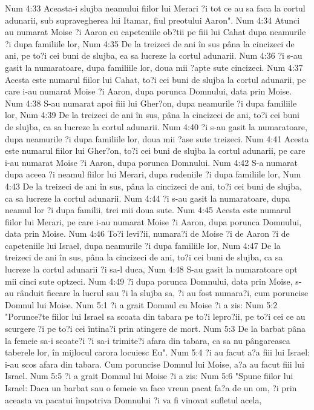 Num 4:33  Aceasta-i slujba neamului fiilor lui Merari ?i tot ce au sa faca la cortul adunarii, sub supravegherea lui Itamar, fiul preotului Aaron".
Num 4:34  Atunci au numarat Moise ?i Aaron cu capeteniile ob?tii pe fiii lui Cahat dupa neamurile ?i dupa familiile lor,
Num 4:35  De la treizeci de ani în sus pâna la cincizeci de ani, pe to?i cei buni de slujba, ea sa lucreze la cortul adunarii.
Num 4:36  ?i s-au gasit la numaratoare, dupa familiile lor, doua mii ?apte sute cincizeci.
Num 4:37  Acesta este numarul fiilor lui Cahat, to?i cei buni de slujba la cortul adunarii, pe care i-au numarat Moise ?i Aaron, dupa porunca Domnului, data prin Moise.
Num 4:38  S-au numarat apoi fiii lui Gher?on, dupa neamurile ?i dupa familiile lor,
Num 4:39  De la treizeci de ani în sus, pâna la cincizeci de ani, to?i cei buni de slujba, ca sa lucreze la cortul adunarii.
Num 4:40  ?i s-au gasit la numaratoare, dupa neamurile ?i dupa familiile lor, doua mii ?ase sute treizeci.
Num 4:41  Acesta este numarul fiilor lui Gher?on, to?i cei buni de slujba la cortul adunarii, pe care i-au numarat Moise ?i Aaron, dupa porunca Domnului.
Num 4:42  S-a numarat dupa aceea ?i neamul fiilor lui Merari, dupa rudeniile ?i dupa familiile lor,
Num 4:43  De la treizeci de ani în sus, pâna la cincizeci de ani, to?i cei buni de slujba, ca sa lucreze la cortul adunarii.
Num 4:44  ?i s-au gasit la numaratoare, dupa neamul lor ?i dupa familii, trei mii doua sute.
Num 4:45  Acesta este numarul fiilor lui Merari, pe care i-au numarat Moise ?i Aaron, dupa porunca Domnului, data prin Moise.
Num 4:46  To?i levi?ii, numara?i de Moise ?i de Aaron ?i de capeteniile lui Israel, dupa neamurile ?i dupa familiile lor,
Num 4:47  De la treizeci de ani în sus, pâna la cincizeci de ani, to?i cei buni de slujba, ca sa lucreze la cortul adunarii ?i sa-l duca,
Num 4:48  S-au gasit la numaratoare opt mii cinci sute optzeci.
Num 4:49  ?i dupa porunca Domnului, data prin Moise, s-au rânduit fiecare la lucrul sau ?i la slujba sa, ?i au fost numara?i, cum poruncise Domnul lui Moise.
Num 5:1  ?i a grait Domnul cu Moise ?i a zis:
Num 5:2  "Porunce?te fiilor lui Israel sa scoata din tabara pe to?i lepro?ii, pe to?i cei ce au scurgere ?i pe to?i cei întina?i prin atingere de mort.
Num 5:3  De la barbat pâna la femeie sa-i scoate?i ?i sa-i trimite?i afara din tabara, ca sa nu pângareasca taberele lor, în mijlocul carora locuiesc Eu".
Num 5:4  ?i au facut a?a fiii lui Israel: i-au scos afara din tabara. Cum poruncise Domnul lui Moise, a?a au facut fiii lui Israel.
Num 5:5  ?i a grait Domnul lui Moise ?i a zis:
Num 5:6  "Spune fiilor lui Israel: Daca un barbat sau o femeie va face vreun pacat fa?a de un om, ?i prin aceasta va pacatui împotriva Domnului ?i va fi vinovat sufletul acela,
